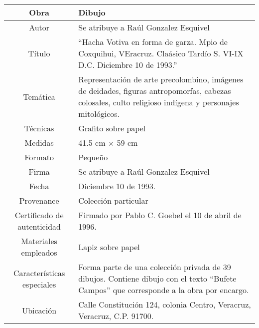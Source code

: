 \begin{table}[H]
\centering
\begin{tabular}{|c|m{}|}
\hline
Obra& Dibujo	\\
\hline
Autor & Se atribuye a Ra\'ul Gonzalez Esquivel\\
\hline
T\'itulo & ``Hacha Votiva en forma de garza. Mpio de Coxquihui, VEracruz. Cla\'asico Tard\'io S. VI-IX D.C. Diciembre 10 de 1993.''\\
\hline
Tem\'atica & Representaci\'on de arte precolombino, im\'agenes de deidades, figuras antropomorfas, cabezas colosales, culto religioso ind\'igena y personajes mitol\'ogicos.\\
\hline
T\'ecnicas &Grafito sobre papel \\
\hline
Medidas & 41.5 cm $\times$ 59 cm \\
\hline
 Formato & Peque\~no \\
 \hline
 Firma & Se atribuye a Ra\'ul Gonzalez Esquivel\\ 
 \hline
  Fecha & Diciembre 10 de 1993.\\
 \hline
 Provenance & Colecci\'on particular\\
 \hline
 Certificado de autenticidad& Firmado por Pablo C. Goebel el 10 de abril de 1996.  \\
 \hline 
  Materiales empleados & Lapiz sobre papel\\
 \hline
 Caracter\'isticas especiales & Forma parte de una colecci\'on privada de 39 dibujos. 
Contiene dibujo con el texto ``Bufete Campos'' que corresponde a la obra por encargo. \\
\hline 
Ubicaci\'on & Calle Constituci\'on 124, colonia Centro, Veracruz, Veracruz, C.P. 91700.\\
\hline

\end{tabular}
\end{table}

